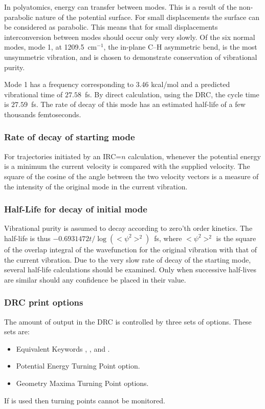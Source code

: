 In polyatomics, energy can  transfer  between  modes.   This  is  a result  of
the non-parabolic nature of the potential surface.  For small displacements the
surface can be considered as  parabolic.   This  means that  for small
displacements interconversion between modes should occur only very slowly.  Of
the six normal modes, mode 1, at 1209.5~cm$^{-1}$, the in-plane C--H asymmetric
bend, is the most unsymmetric vibration, and is chosen to demonstrate
conservation of vibrational purity.

Mode 1 has a  frequency  corresponding  to  3.46  kcal/mol  and  a predicted
vibrational time of $27.58$~fs.  By direct calculation, using the DRC, the
cycle time is $27.59$~fs.  The rate of decay of this mode  has  an estimated
half-life of a few thousands femtoseconds.

\subsubsection{Rate of decay of starting mode}
For trajectories initiated by an IRC=$n$  calculation,  whenever  the
potential  energy is a minimum the current velocity is compared with the
supplied velocity.  The square of the cosine of the  angle  between  the two
velocity vectors is a measure of the intensity of the original mode in the
current vibration.

\subsubsection{Half-Life for decay of initial mode}
Vibrational purity is assumed to decay according to  zero'th  order kinetics.
The  half-life is thus $-0.6931472t/\log(<\!\psi^2\!>^2)$~fs, where
$<\!\psi^2\!>^2$ is the square of  the overlap integral of the wavefunction for
the  original vibration with that of the current  vibration.   Due to the  very
slow rate of decay of the starting mode, several half-life calculations
should  be  examined.   Only  when successive  half-lives  are  similar  should
any confidence be placed in their value.

\subsubsection{DRC print options}
The amount of output in the DRC is  controlled  by  three  sets  of
options.  These sets are:
\begin{itemize}
\item Equivalent Keywords , , and
.
\item Potential Energy Turning Point option.
\item Geometry Maxima Turning Point options.
\end{itemize}
If  is used then  turning  points  cannot  be  monitored.

